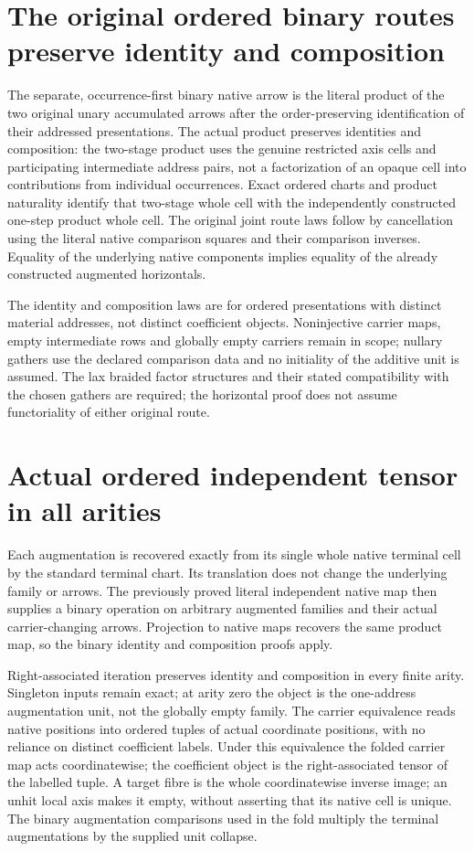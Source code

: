 \documentclass{article}
\begin{document}
\section*{The original ordered binary routes preserve identity and composition}
The separate, occurrence-first binary native arrow is the literal
product of the two original unary accumulated arrows after the
order-preserving identification of their addressed presentations.
The actual product preserves identities and composition: the
two-stage product uses the genuine restricted axis cells and
participating intermediate address pairs, not a factorization of an
opaque cell into contributions from individual occurrences. Exact
ordered charts and product naturality identify that two-stage whole
cell with the independently constructed one-step product whole cell.
The original joint route laws follow by cancellation using the
literal native comparison squares and their comparison inverses.
Equality of the underlying native components implies equality of
the already constructed augmented horizontals.

The identity and composition laws are for ordered presentations
with distinct material addresses, not distinct coefficient objects.
Noninjective carrier maps, empty intermediate rows and globally
empty carriers remain in scope; nullary gathers use the declared
comparison data and no initiality of the additive unit is assumed.
The lax braided factor structures and their stated compatibility
with the chosen gathers are required; the horizontal proof does
not assume functoriality of either original route.

\section*{Actual ordered independent tensor in all arities}
Each augmentation is recovered exactly from its single whole native
terminal cell by the standard terminal chart. Its translation does
not change the underlying family or arrows. The previously proved
literal independent native map then supplies a binary operation on
arbitrary augmented families and their actual carrier-changing
arrows. Projection to native maps recovers the same product map,
so the binary identity and composition proofs apply.

Right-associated iteration preserves identity and composition in
every finite arity. Singleton inputs remain exact; at arity zero
the object is the one-address augmentation unit, not the globally
empty family. The carrier equivalence reads native positions into
ordered tuples of actual coordinate positions, with no reliance on
distinct coefficient labels. Under this equivalence the folded
carrier map acts coordinatewise; the coefficient object is the
right-associated tensor of the labelled tuple. A target fibre is
the whole coordinatewise inverse image; an unhit local axis makes
it empty, without asserting that its native cell is unique. The
binary augmentation comparisons used in the fold multiply the
terminal augmentations by the supplied unit collapse.
\end{document}
